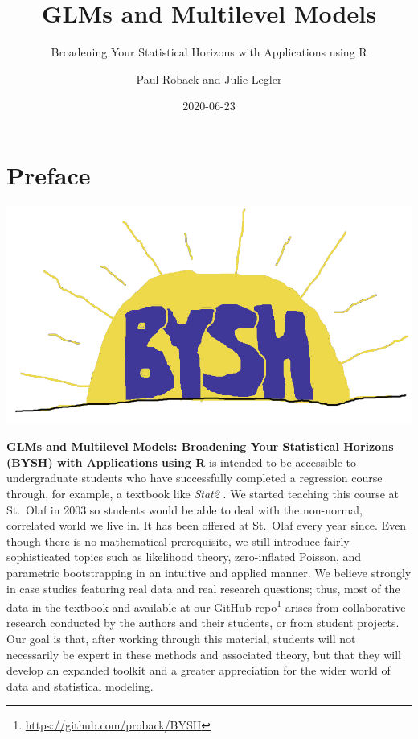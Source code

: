 \documentclass[
]{krantz}
\title{GLMs and Multilevel Models}
\subtitle{Broadening Your Statistical Horizons with Applications using R}
\author{Paul Roback and Julie Legler}
\date{2020-06-23}
\renewcommand{\href}[2]{#2\footnote{\url{#1}}}
\begin{document}
\maketitle


\thispagestyle{empty}

\setlength{\abovedisplayskip}{-5pt}
\setlength{\abovedisplayshortskip}{-5pt}

{
\hypersetup{linkcolor=}
\setcounter{tocdepth}{2}
\tableofcontents
}
\mainmatter

\hypertarget{preface}{%
\chapter*{Preface}\label{preface}}


\includegraphics[width=0.75\linewidth]{data/cover}

\textbf{GLMs and Multilevel Models: Broadening Your Statistical Horizons (BYSH) with Applications using R} is intended to be accessible to undergraduate students who have successfully completed a regression course through, for example, a textbook like \emph{Stat2} \citep{Cannon2019}. We started teaching this course at St.~Olaf in 2003 so students would be able to deal with the non-normal, correlated world we live in. It has been offered at St.~Olaf every year since. Even though there is no mathematical prerequisite, we still introduce fairly sophisticated topics such as likelihood theory, zero-inflated Poisson, and parametric bootstrapping in an intuitive and applied manner. We believe strongly in case studies featuring real data and real research questions; thus, most of the data in the textbook and \href{https://github.com/proback/BYSH}{available at our GitHub repo} arises from collaborative research conducted by the authors and their students, or from student projects. Our goal is that, after working through this material, students will not necessarily be expert in these methods and associated theory, but that they will develop an expanded toolkit and a greater appreciation for the wider world of data and statistical modeling.
\end{document}
